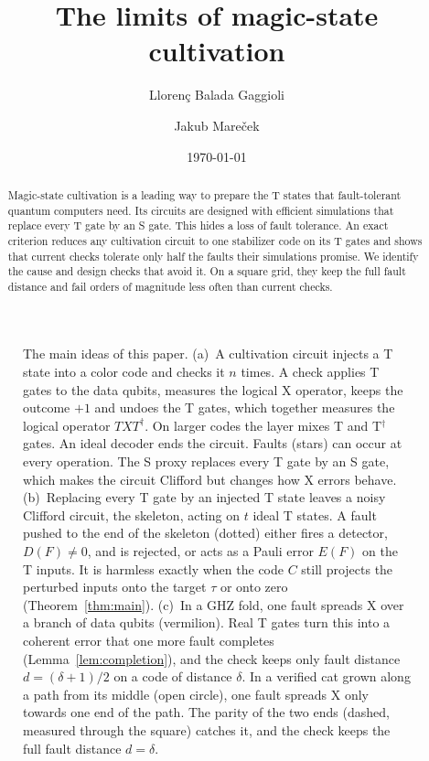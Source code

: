 \documentclass[aps,prl,reprint,twocolumn,amsmath,amssymb,floatfix,nofootinbib,superscriptaddress]{revtex4-2}
\theoremstyle{definition}
\theoremstyle{remark}
\begin{document}
\title{The limits of magic-state cultivation}
\author{Lloren\c{c} Balada Gaggioli}
\author{Jakub Mare\v{c}ek}
\date{\today}
\begin{abstract}
Magic-state cultivation is a leading way to prepare the T states that fault-tolerant quantum computers need. Its circuits are designed with efficient simulations that replace every T gate by an S gate. This hides a loss of fault tolerance. An exact criterion reduces any cultivation circuit to one stabilizer code on its T gates and shows that current checks tolerate only half the faults their simulations promise. We identify the cause and design checks that avoid it. On a square grid, they keep the full fault distance and fail orders of magnitude less often than current checks.
\end{abstract}
\maketitle

\begin{figure}[t]
\centering

\caption{The main ideas of this paper. (a)~A cultivation circuit injects a T state into a color code and checks it $n$ times. A check applies T gates to the data qubits, measures the logical X operator, keeps the outcome $+1$ and undoes the T gates, which together measures the logical operator $TXT^\dagger$. On larger codes the layer mixes T and T$^\dagger$ gates. An ideal decoder ends the circuit. Faults (stars) can occur at every operation. The S proxy replaces every T gate by an S gate, which makes the circuit Clifford but changes how X errors behave. (b)~Replacing every T gate by an injected T state leaves a noisy Clifford circuit, the skeleton, acting on $t$ ideal T states. A fault pushed to the end of the skeleton (dotted) either fires a detector, $D(F)\neq0$, and is rejected, or acts as a Pauli error $E(F)$ on the T inputs. It is harmless exactly when the code $C$ still projects the perturbed inputs onto the target $\tau$ or onto zero (Theorem~\ref{thm:main}). (c)~In a GHZ fold, one fault spreads X over a branch of data qubits (vermilion). Real T gates turn this into a coherent error that one more fault completes (Lemma~\ref{lem:completion}), and the check keeps only fault distance $d=(\delta+1)/2$ on a code of distance $\delta$. In a verified cat grown along a path from its middle (open circle), one fault spreads X only towards one end of the path. The parity of the two ends (dashed, measured through the square) catches it, and the check keeps the full fault distance $d=\delta$.}
\label{fig:concept}
\end{figure}
\end{document}
